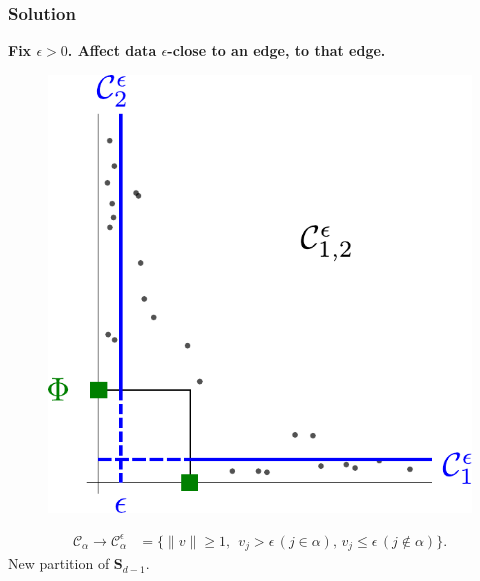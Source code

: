 \documentclass[9pt]{beamer}
\begin{document}
\begin{frame}
\frametitle{Solution}
 \textbf{Fix $\epsilon>0$. Affect data  $\epsilon$-close to an edge,
   to that edge. }

\begin{figure}[h]
  \centering
  \includegraphics[scale=0.4]{sourcefigs/representation2Drect.pdf}
\end{figure}

\begin{align*}
\mathcal{C}_\alpha\to \mathcal{C}_\alpha^\epsilon &= \{\|v\|\ge 1,~~ v_j>\epsilon\, (j\in\alpha),\,v_j \le \epsilon \,(j\notin\alpha) \}. 
\end{align*}
New partition of $\mathbf{S}_{d-1}$.%
\end{frame}
\end{document}
